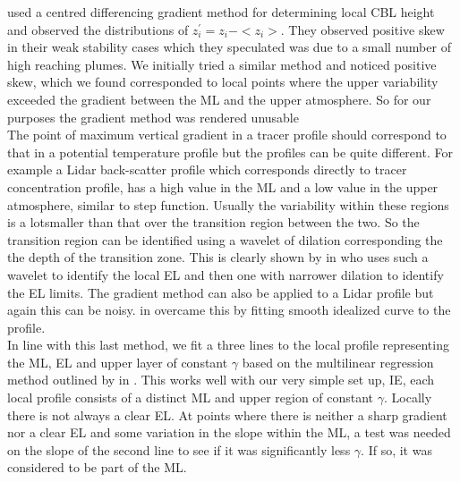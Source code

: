 \citeauthor{SullMoengStev} \cite{SullMoengStev} used a centred differencing gradient method for determining local \acs{CBL} height  and observed the distributions
of $z_{i}^{'} = z_{i}-<z_{i}>$.  They observed positive skew in their weak stability cases which
they speculated was due to a small number of high reaching plumes.  We initially tried a similar
method and noticed positive skew, which we found corresponded to local points where the upper variability
exceeded the gradient between the \acs{ML} and the upper atmosphere. So for our purposes the gradient method was rendered unusable\\

The point of maximum vertical gradient in  a tracer profile should correspond to that in a potential 
temperature profile but the profiles can be quite different.  For example a Lidar back-scatter profile
which corresponds directly to tracer concentration profile, has a high value in the \acs{ML} and a low
value in the upper atmosphere, similar to step function.  Usually the variability within these regions 
is a lotsmaller than that over the transition region between the two.  So the transition region can be 
identified using a wavelet of dilation corresponding the the depth of the transition zone.  This is 
clearly shown by \citeauthor{Brooks} in \cite{Brooks} who uses such a wavelet to identify the local \acs{EL}
and then one with narrower dilation to identify the \acs{EL} limits.  The gradient method can also be applied
to a Lidar profile but again this can be noisy. %
\citeauthor{SteynBaldHoff}
in \cite{SteynBaldHoff} overcame this by fitting smooth idealized curve to the profile.\\

In line with this last method, we fit a three lines to the local profile representing the \acs{ML}, 
\acs{EL} and upper layer of constant $\gamma$ based on the multilinear regression method outlined by \citeauthor{Vieth} in 
\cite{Vieth}.  This works well with our very simple set up, IE, each local profile consists
of a distinct \acs{ML} and upper region of constant $\gamma$. Locally there is not always
a clear \acs{EL}.  At points where there is neither a sharp gradient nor a clear \acs{EL} 
and some variation in the slope within the \acs{ML}, a test was needed on the slope of 
the second line to see if it was significantly less $\gamma$.  If so, it was considered
to be part of the \acs{ML}.\\

